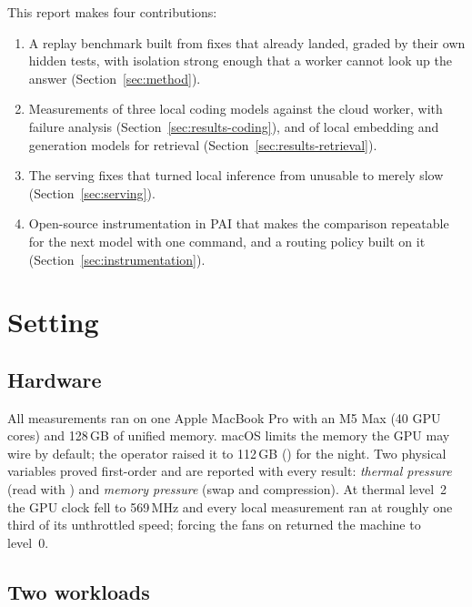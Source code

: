 This report makes four contributions:
\begin{enumerate}
	\item A replay benchmark built from fixes that already landed, graded by their own hidden tests, with isolation
	strong enough that a worker cannot look up the answer (Section~\ref{sec:method}).
	\item Measurements of three local coding models against the cloud worker, with failure analysis
	(Section~\ref{sec:results-coding}), and of local embedding and generation models for retrieval
	(Section~\ref{sec:results-retrieval}).
	\item The serving fixes that turned local inference from unusable to merely slow (Section~\ref{sec:serving}).
	\item Open-source instrumentation in PAI \citep{Nott-2026aa} that makes the comparison repeatable for the next
	model with one command, and a routing policy built on it (Section~\ref{sec:instrumentation}).
\end{enumerate}

\section{Setting}\label{sec:setting}

\subsection{Hardware}

All measurements ran on one Apple MacBook Pro with an M5 Max (40 GPU cores) and 128\,GB of unified memory. macOS limits
the memory the GPU may wire by default; the operator raised it to 112\,GB ()
for the night. Two physical variables proved first-order and are reported with every result: \emph{thermal pressure}
(read with ) and \emph{memory pressure} (swap and
compression). At thermal level~2 the GPU clock fell to 569\,MHz and every local measurement ran at roughly one third
of its unthrottled speed; forcing the fans on returned the machine to level~0.

\subsection{Two workloads}

